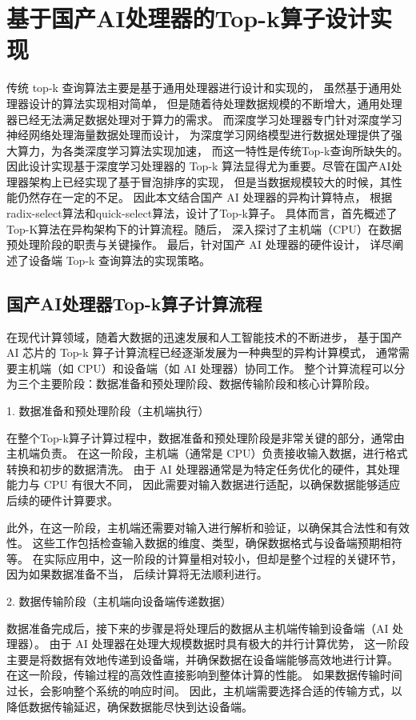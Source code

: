 \chapter{基于国产AI处理器的Top-k算子设计实现}
传统 top-k 查询算法主要是基于通用处理器进行设计和实现的，
虽然基于通用处理器设计的算法实现相对简单，
但是随着待处理数据规模的不断增大，通用处理器已经无法满足数据处理对于算力的需求。
而深度学习处理器专门针对深度学习神经网络处理海量数据处理而设计，
为深度学习网络模型进行数据处理提供了强大算力，为各类深度学习算法实现加速，
而这一特性是传统Top-k查询所缺失的。因此设计实现基于深度学习处理器的 
Top-k 算法显得尤为重要。尽管在国产AI处理器架构上已经实现了基于冒泡排序的实现，
但是当数据规模较大的时候，其性能仍然存在一定的不足。
因此本文结合国产 AI 处理器的异构计算特点，
根据radix-select算法和quick-select算法，设计了Top-k算子。
具体而言，首先概述了Top-K算法在异构架构下的计算流程。随后，
深入探讨了主机端（CPU）在数据预处理阶段的职责与关键操作。
最后，针对国产 AI 处理器的硬件设计，
详尽阐述了设备端 Top-k 查询算法的实现策略。


\section{国产AI处理器Top-k算子计算流程}
在现代计算领域，随着大数据的迅速发展和人工智能技术的不断进步，
基于国产 AI 芯片的 Top-k 算子计算流程已经逐渐发展为一种典型的异构计算模式，
通常需要主机端（如 CPU）和设备端（如 AI 处理器）协同工作。
整个计算流程可以分为三个主要阶段：数据准备和预处理阶段、数据传输阶段和核心计算阶段。

1. 数据准备和预处理阶段（主机端执行）

在整个Top-k算子计算过程中，数据准备和预处理阶段是非常关键的部分，通常由主机端负责。
在这一阶段，主机端（通常是 CPU）负责接收输入数据，进行格式转换和初步的数据清洗。
由于 AI 处理器通常是为特定任务优化的硬件，其处理能力与 CPU 有很大不同，
因此需要对输入数据进行适配，以确保数据能够适应后续的硬件计算要求。

此外，在这一阶段，主机端还需要对输入进行解析和验证，以确保其合法性和有效性。
这些工作包括检查输入数据的维度、类型，确保数据格式与设备端预期相符等。
在实际应用中，这一阶段的计算量相对较小，但却是整个过程的关键环节，因为如果数据准备不当，
后续计算将无法顺利进行。

2. 数据传输阶段（主机端向设备端传递数据）

数据准备完成后，接下来的步骤是将处理后的数据从主机端传输到设备端（AI 处理器）。
由于 AI 处理器在处理大规模数据时具有极大的并行计算优势，
这一阶段主要是将数据有效地传递到设备端，并确保数据在设备端能够高效地进行计算。
在这一阶段，传输过程的高效性直接影响到整体计算的性能。
如果数据传输时间过长，会影响整个系统的响应时间。
因此，主机端需要选择合适的传输方式，以降低数据传输延迟，确保数据能尽快到达设备端。


